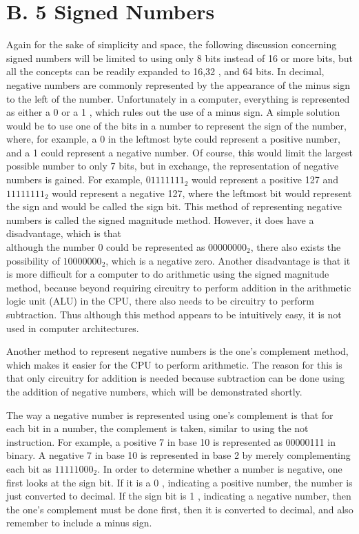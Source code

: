 \documentclass[10pt]{article}
\begin{document}
\section*{B. 5 Signed Numbers}
Again for the sake of simplicity and space, the following discussion concerning signed numbers will be limited to using only 8 bits instead of 16 or more bits, but all the concepts can be readily expanded to 16,32 , and 64 bits. In decimal, negative numbers are commonly represented by the appearance of the minus sign to the left of the number. Unfortunately in a computer, everything is represented as either a 0 or a 1 , which rules out the use of a minus sign. A simple solution would be to use one of the bits in a number to represent the sign of the number, where, for example, a 0 in the leftmost byte could represent a positive number, and a 1 could represent a negative number. Of course, this would limit the largest possible number to only 7 bits, but in exchange, the representation of negative numbers is gained. For example, $01111111_{2}$ would represent a positive 127 and $11111111_{2}$ would represent a negative 127, where the leftmost bit would represent the sign and would be called the sign bit. This method of representing negative numbers is called the signed magnitude method. However, it does have a disadvantage, which is that\\
although the number 0 could be represented as $00000000_{2}$, there also exists the possibility of $10000000_{2}$, which is a negative zero. Another disadvantage is that it is more difficult for a computer to do arithmetic using the signed magnitude method, because beyond requiring circuitry to perform addition in the arithmetic logic unit (ALU) in the CPU, there also needs to be circuitry to perform subtraction. Thus although this method appears to be intuitively easy, it is not used in computer architectures.

Another method to represent negative numbers is the one's complement method, which makes it easier for the CPU to perform arithmetic. The reason for this is that only circuitry for addition is needed because subtraction can be done using the addition of negative numbers, which will be demonstrated shortly.

The way a negative number is represented using one's complement is that for each bit in a number, the complement is taken, similar to using the not instruction. For example, a positive 7 in base 10 is represented as 00000111 in binary. A negative 7 in base 10 is represented in base 2 by merely complementing each bit as $11111000_{2}$. In order to determine whether a number is negative, one first looks at the sign bit. If it is a 0 , indicating a positive number, the number is just converted to decimal. If the sign bit is 1 , indicating a negative number, then the one's complement must be done first, then it is converted to decimal, and also remember to include a minus sign.
\end{document}
